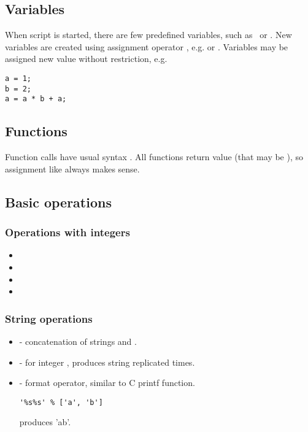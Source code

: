 \subsection{Variables}
When script is started, there are few predefined variables, such as \true\ or \none.
New variables are created using assignment operator \code{=}, e.g.  or
. Variables may be assigned new value without restriction, e.g.
\begin{verbatim}
a = 1;
b = 2;
a = a * b + a;
\end{verbatim}

\subsection{Functions}
Function calls have usual syntax . All functions
return value (that may be \none), so assignment like  always 
makes sense.

\subsection{Basic operations}

\subsubsection{Operations with integers}

\begin{itemize}
\item {}
\item {}
\item {}
\item {}
\end{itemize}

\subsubsection{String operations}

\begin{itemize}
\item {} - concatenation of strings  and .
\item {} - for integer , produces string  replicated
 times.
\item {} - format operator, similar to C printf function.
\begin{verbatim}
'%s%s' % ['a', 'b']
\end{verbatim}
produces 'ab'.

\end{itemize}


